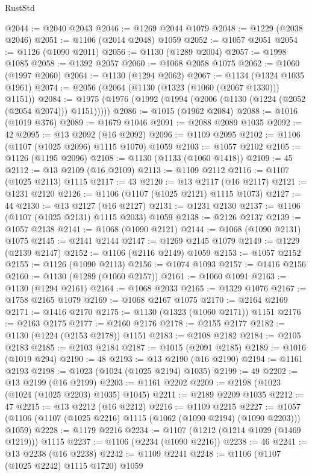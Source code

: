 \begin{lexlean}{RustStd}
\begin{coremodule}
@2044 := @2040 @2043
@2046 := @1269 @2044 @1079
@2048 := @1229 (@2038 @2046)
@2051 := @1106 (@2014 @2048) @1059
@2052 := @1057 @2051
@2054 := @1126 (@1090 @2011)
@2056 := @1130 (@1289 @2004)
@2057 := @1998 @1085
@2058 := @1392 @2057
@2060 := @1068 @2058 @1075
@2062 := @1060 (@1997 @2060)
@2064 := @1130 (@1294 @2062)
@2067 := @1134 (@1324 @1035 @1961)
@2074 := @2056 (@2064 (@1130 (@1323 (@1060 (@2067 @1330))) @1151))
@2084 := @1975 (@1976 (@1992 (@1994 (@2006 (@1130 (@1224 (@2052 (@2054 @2074))) @1151)))))
@2086 := @1015 (@1962 @2084)
@2088 := @1016 (@1019 @376)
@2089 := @1679 @1046
@2091 := @2088 @2089 @1035
@2092 := 42
@2095 := @13 @2092 (@16 @2092)
@2096 := @1109 @2095
@2102 := @1106 (@1107 (@1025 @2096) @1115 @1070) @1059
@2103 := @1057 @2102
@2105 := @1126 (@1195 @2096)
@2108 := @1130 (@1133 (@1060 @1418))
@2109 := 45
@2112 := @13 @2109 (@16 @2109)
@2113 := @1109 @2112
@2116 := @1107 (@1025 @2113) @1115
@2117 := 43
@2120 := @13 @2117 (@16 @2117)
@2121 := @1231 @2120
@2126 := @1106 (@1107 (@1025 @2121) @1115 @1073)
@2127 := 44
@2130 := @13 @2127 (@16 @2127)
@2131 := @1231 @2130
@2137 := @1106 (@1107 (@1025 @2131) @1115 @2033) @1059
@2138 := @2126 @2137
@2139 := @1057 @2138
@2141 := @1068 (@1090 @2121)
@2144 := @1068 (@1090 @2131) @1075
@2145 := @2141 @2144
@2147 := @1269 @2145 @1079
@2149 := @1229 (@2139 @2147)
@2152 := @1106 (@2116 @2149) @1059
@2153 := @1057 @2152
@2155 := @1126 (@1090 @2113)
@2156 := @1074 @1093
@2157 := @1416 @2156
@2160 := @1130 (@1289 (@1060 @2157))
@2161 := @1060 @1091
@2163 := @1130 (@1294 @2161)
@2164 := @1068 @2033
@2165 := @1329 @1076
@2167 := @1758 @2165 @1079
@2169 := @1068 @2167 @1075
@2170 := @2164 @2169
@2171 := @1416 @2170
@2175 := @1130 (@1323 (@1060 @2171)) @1151
@2176 := @2163 @2175
@2177 := @2160 @2176
@2178 := @2155 @2177
@2182 := @1130 (@1224 (@2153 @2178)) @1151
@2183 := @2108 @2182
@2184 := @2105 @2183
@2185 := @2103 @2184
@2187 := @1015 (@2091 @2185)
@2189 := @1016 (@1019 @294)
@2190 := 48
@2193 := @13 @2190 (@16 @2190)
@2194 := @1161 @2193
@2198 := @1023 (@1024 (@1025 @2194) @1035)
@2199 := 49
@2202 := @13 @2199 (@16 @2199)
@2203 := @1161 @2202
@2209 := @2198 (@1023 (@1024 (@1025 @2203) @1035) @1045)
@2211 := @2189 @2209 @1035
@2212 := 47
@2215 := @13 @2212 (@16 @2212)
@2216 := @1109 @2215
@2227 := @1057 (@1106 (@1107 (@1025 @2216) @1115 (@1062 (@1090 @2194) (@1090 @2203))) @1059)
@2228 := @1179 @2216
@2234 := @1107 (@1212 (@1214 @1029 (@1469 @1219))) @1115
@2237 := @1106 (@2234 (@1090 @2216))
@2238 := 46
@2241 := @13 @2238 (@16 @2238)
@2242 := @1109 @2241
@2248 := @1106 (@1107 (@1025 @2242) @1115 @1720) @1059

\end{coremodule}
\end{lexlean}

